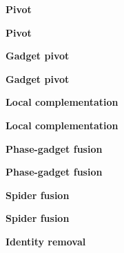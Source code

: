 \documentclass{article}
\begin{document}
\begin{center}
\textbf{Pivot}\par\medskip

\end{center}
\clearpage
\begin{center}
\textbf{Pivot}\par\medskip

\end{center}
\clearpage
\begin{center}
\textbf{Gadget pivot}\par\medskip

\end{center}
\clearpage
\begin{center}
\textbf{Gadget pivot}\par\medskip

\end{center}
\clearpage
\begin{center}
\textbf{Local complementation}\par\medskip

\end{center}
\clearpage
\begin{center}
\textbf{Local complementation}\par\medskip

\end{center}
\clearpage
\begin{center}
\textbf{Phase-gadget fusion}\par\medskip

\end{center}
\clearpage
\begin{center}
\textbf{Phase-gadget fusion}\par\medskip

\end{center}
\clearpage
\begin{center}
\textbf{Spider fusion}\par\medskip

\end{center}
\clearpage
\begin{center}
\textbf{Spider fusion}\par\medskip

\end{center}
\clearpage
\begin{center}
\textbf{Identity removal}\par\medskip

\end{center}
\end{document}
